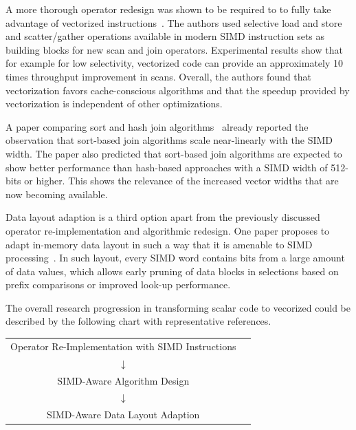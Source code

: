 \documentclass[sigconf]{acmart}
\begin{document}
A more thorough operator redesign was shown to be required to to fully take advantage of vectorized 
instructions~\cite{Polychroniou:2015:RSV:2723372.2747645}. The authors used selective load and store and scatter/gather operations available
in modern SIMD instruction sets as building blocks for new scan and join operators. Experimental results show that for example for low
selectivity, vectorized code can provide an approximately 10 times throughput improvement in scans. Overall, the authors found that
vectorization favors cache-conscious algorithms and that the speedup provided by vectorization is independent of other optimizations.

A paper comparing sort and hash join algorithms~\cite{DBLP:journals/pvldb/KimSCKNBLSD09} already reported the observation that sort-based join
algorithms scale near-linearly with the SIMD width. The paper also predicted that sort-based join algorithms are expected to show better
performance than hash-based approaches with a SIMD width of 512-bits or higher. This shows the relevance of the increased vector widths that
are now becoming available.

Data layout adaption is a third option apart from the previously discussed operator re-implementation and algorithmic redesign. One paper proposes
to adapt in-memory data layout in such a way that it is amenable to SIMD processing~\cite{Li:2013:BFS:2463676.2465322}. In such layout, every
SIMD word contains bits from a large amount of data values, which allows early pruning of data blocks in selections based on prefix comparisons
or improved look-up performance.

The overall research progression in transforming scalar code to vecorized could be described by the following chart with
representative references.

\begin{center}
\begin{tabular}{cr}
Operator Re-Implementation with SIMD Instructions & \cite{DBLP:conf/sigmod/ZhouR02} \\
$\downarrow$ & \\
SIMD-Aware Algorithm Design & \cite{Polychroniou:2015:RSV:2723372.2747645} \\
$\downarrow$ & \\
SIMD-Aware Data Layout Adaption & \cite{Li:2013:BFS:2463676.2465322}\\
\end{tabular}
\end{center}
\end{document}
